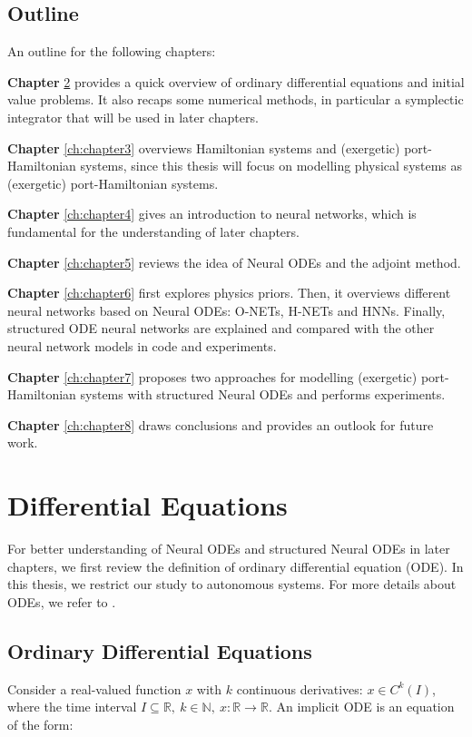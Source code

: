 \documentclass[
	parskip, 			   %
	twoside, 			   %
	DIV=14, 			   %
	BCOR=15.0mm, 		   %
	headsepline, 		   %
	open=right, 		   %
	captions=tableheading, %
	bibliography=totoc,    %
	numbers=noenddot       %
]{scrreprt}
\begin{document}
\section{Outline}
An outline for the following chapters:

\textbf{Chapter} \ref{ch:chapter2} provides a quick overview of ordinary differential equations and initial value problems. It also recaps some numerical methods, in particular a symplectic integrator that will be used in later chapters.

\textbf{Chapter} \ref{ch:chapter3} overviews Hamiltonian systems and (exergetic) port-Hamiltonian systems, since this thesis will focus on modelling physical systems as (exergetic) port-Hamiltonian systems.

\textbf{Chapter} \ref{ch:chapter4} gives an introduction to neural networks, which is fundamental for the understanding of later chapters.

\textbf{Chapter} \ref{ch:chapter5} reviews the idea of Neural ODEs and the adjoint method.

\textbf{Chapter} \ref{ch:chapter6} first explores physics priors. Then, it overviews different neural networks based on Neural ODEs: O-NETs, H-NETs and HNNs. Finally, structured ODE neural networks are explained and compared with the other neural network models in code and experiments.

\textbf{Chapter} \ref{ch:chapter7} proposes two approaches for modelling (exergetic) port-Hamiltonian systems with structured Neural ODEs and performs experiments.

\textbf{Chapter} \ref{ch:chapter8} draws conclusions and provides an outlook for future work.


\clearpage
\chapter{Differential Equations}
\label{ch:chapter2}
For better understanding of Neural ODEs and structured Neural ODEs in later chapters, we first review the definition of ordinary differential equation (ODE). In this thesis, we restrict our study to autonomous systems. For more details about ODEs, we refer to \cite{teschl2012ordinary}.
\section{Ordinary Differential Equations}
Consider a real-valued function $x$ with $k$ continuous derivatives: $x \in C^{k}(I)$, where the time interval $ I \subseteq \mathbb{R}, \: k \in \mathbb{N}, \: x: \mathbb{R} \rightarrow \mathbb{R}$. An implicit ODE is an equation of the form:
\end{document}
